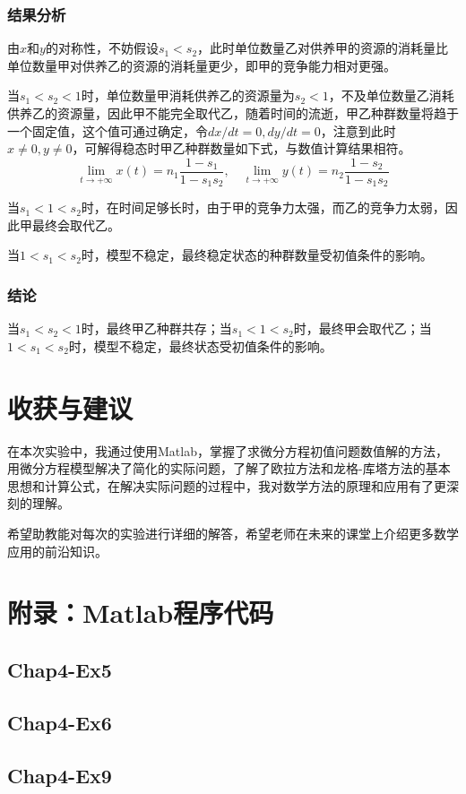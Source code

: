 \documentclass[12pt,a4paper]{article}
\begin{document}
\subsubsection{结果分析}

由$x$和$y$的对称性，不妨假设$s_1 < s_2$，此时单位数量乙对供养甲的资源的消耗量比单位数量甲对供养乙的资源的消耗量更少，即甲的竞争能力相对更强。

当$s_1 < s_2 < 1$时，单位数量甲消耗供养乙的资源量为$s_2<1$，不及单位数量乙消耗供养乙的资源量，因此甲不能完全取代乙，随着时间的流逝，甲乙种群数量将趋于一个固定值，这个值可通过确定，令$dx/dt=0,dy/dt=0$，注意到此时$x\ne 0, y\ne 0$，可解得稳态时甲乙种群数量如下式，与数值计算结果相符。
\begin{equation}
    \lim_{t\rightarrow +\infty}x(t)=n_1\frac{1-s_1}{1-s_1s_2},\quad
    \lim_{t\rightarrow +\infty}y(t)=n_2\frac{1-s_2}{1-s_1s_2}
\end{equation}

当$s_1 < 1 < s_2$时，在时间足够长时，由于甲的竞争力太强，而乙的竞争力太弱，因此甲最终会取代乙。

当$1 < s_1 < s_2$时，模型不稳定，最终稳定状态的种群数量受初值条件的影响。

\subsubsection{结论}

当$s_1 < s_2 < 1$时，最终甲乙种群共存；当$s_1 < 1 < s_2$时，最终甲会取代乙；当$1 < s_1 < s_2$时，模型不稳定，最终状态受初值条件的影响。

\section{收获与建议}

在本次实验中，我通过使用Matlab，掌握了求微分方程初值问题数值解的方法，用微分方程模型解决了简化的实际问题，了解了欧拉方法和龙格-库塔方法的基本思想和计算公式，在解决实际问题的过程中，我对数学方法的原理和应用有了更深刻的理解。

希望助教能对每次的实验进行详细的解答，希望老师在未来的课堂上介绍更多数学应用的前沿知识。

\section{附录：Matlab程序代码}

\subsection{Chap4-Ex5}\label{sec:ex5_code}



\subsection{Chap4-Ex6}\label{sec:ex6_code}



\subsection{Chap4-Ex9}\label{sec:ex9_code}


\end{document}

